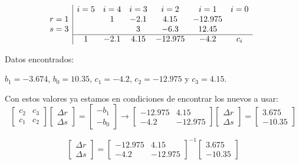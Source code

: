 \documentclass{article}
\begin{document}
\begin{equation*}
   \begin{array}{c|ccccccc}
       &i = 5 & i = 4 & i = 3 & i = 2 & i = 1 & i = 0 & \\
       r = 1 & & 1 &-2.1&4.15&-12.975& & \\
       s = 3 & & & 3 & -6.3 & 12.45 &  & \\
       \cline{2-7}
         & 1 & -2.1 & 4.15 & -12.975 & -4.2 & c_i& \\
     \end{array}
\end{equation*}


Datos encontrados:


$b_1 = -3.674$, $b_0 = 10.35$, $c_1= -4.2$, $c_2 = -12.975$ y $c_3= 4.15$.


Con estos valores ya estamos en condiciones de encontrar los nuevos a usar:
\begin{equation*}
   \begin{bmatrix}
   c_2 & c_3\\
   c_1& c_2
   \end{bmatrix}
   \begin{bmatrix}
       \varDelta r \\
       \varDelta s
   \end{bmatrix}
   =
   \begin{bmatrix}
       -b_1\\
       -b_0
   \end{bmatrix}
   \rightarrow
   \begin{bmatrix}
       -12.975 & 4.15\\
       -4.2& -12.975
   \end{bmatrix}
   \begin{bmatrix}
       \varDelta r \\
       \varDelta s
   \end{bmatrix}
   =
   \begin{bmatrix}
       3.675  \\
       -10.35
   \end{bmatrix}
\end{equation*}


\begin{equation*}
   \begin{bmatrix}
       \varDelta r \\
       \varDelta s 
   \end{bmatrix}
   =
   \begin{bmatrix}
       -12.975 & 4.15\\
       -4.2& -12.975
   \end{bmatrix}^{-1}
   \begin{bmatrix}
       3.675  \\
       -10.35
   \end{bmatrix}
\end{equation*}
\end{document}
